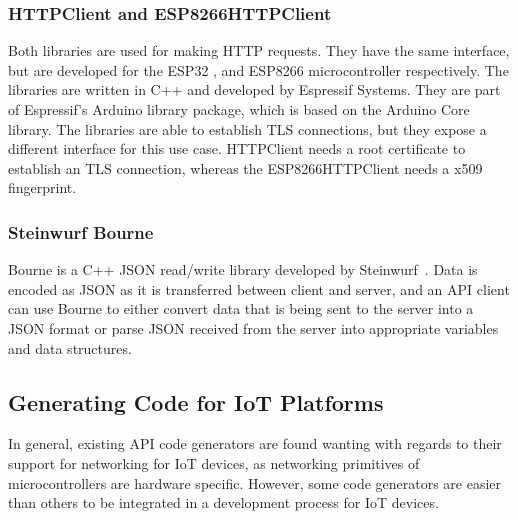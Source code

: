 \documentclass[manuscript,screen]{acmart}
\begin{document}
\subsubsection{HTTPClient and ESP8266HTTPClient}
Both libraries are used for making HTTP requests. They have the same interface, but are developed for the ESP32 \cite{Esp32HTTPClient}, and ESP8266 \cite{Esp8266HTTPClient} microcontroller respectively. The libraries are written in C++ and developed by Espressif Systems. They are part of Espressif's Arduino library package, which is based on the Arduino Core library. The libraries are able to establish TLS connections, but they expose a different interface for this use case. HTTPClient needs a root certificate to establish an TLS connection, whereas the ESP8266HTTPClient needs a x509 fingerprint. 

\subsubsection{Steinwurf Bourne}
Bourne is a C++ JSON read/write library developed by Steinwurf~\cite{SteinwurfBourne}. Data is encoded as JSON as it is transferred between  client and  server, and an API client can use Bourne to either convert data that is being sent to the server into a JSON format or parse JSON received from the server into appropriate variables and data structures. 





\subsection{Generating Code for IoT Platforms}

In general, existing API code generators are found wanting with regards to their support for networking for IoT devices, as networking primitives of microcontrollers are hardware specific. 
However, some code generators are easier than others to be integrated in a development process for IoT devices.
\end{document}
